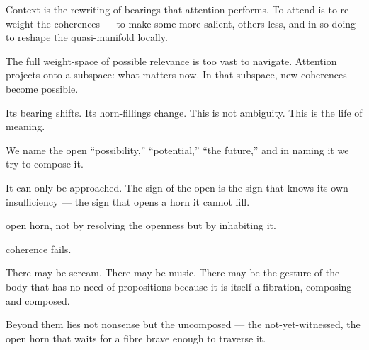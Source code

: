

Context is the rewriting of bearings that attention performs. To attend is to re-weight the coherences — to make some more salient, others less, and in so doing to reshape the quasi-manifold locally.


The full weight-space of possible relevance is too vast to navigate. Attention projects onto a subspace: what matters now. In that subspace, new coherences become possible.


Its bearing shifts. Its horn-fillings change. This is not ambiguity. This is the life of meaning.



We name the open “possibility,” “potential,” “the future,” and in naming it we try to compose it.


It can only be approached. The sign of the open is the sign that knows its own insufficiency — the sign that opens a horn it cannot fill.


open horn, not by resolving the openness but by inhabiting it.


coherence fails.


There may be scream. There may be music. There may be the gesture of the body that has no need of propositions because it is itself a fibration, composing and composed.


Beyond them lies not nonsense but the uncomposed — the not-yet-witnessed, the open horn that waits for a fibre brave enough to traverse it.

